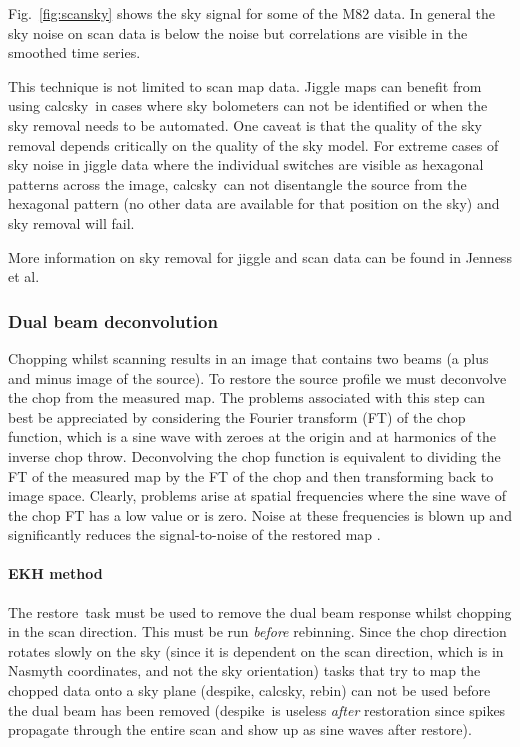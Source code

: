 \documentclass[twoside,11pt]{article}
\newcommand{\task}[1]{{\sf #1}}
\newcommand{\rebin}{\htmlref{\task{rebin}}{REBIN}}
\newcommand{\calcsky}{\htmlref{\task{calcsky}}{CALCSKY}}
\newcommand{\restore}{\htmlref{\task{restore}}{RESTORE}}
\newcommand{\despike}{\htmlref{\task{despike}}{DESPIKE}}
\newcommand{\htmlref}[2]{#1}
\renewcommand{\_}{\texttt{\symbol{95}}}
\begin{document}
Fig.\ \ref{fig:scansky} shows the sky signal for some of the M82 data.
In general the sky noise on scan data is below the noise but correlations
are visible in the smoothed time series.


This technique is not limited to scan map data. Jiggle maps can benefit
from using \calcsky\ in cases where sky bolometers can not be identified
or when the sky removal needs to be automated. One caveat is that the
quality of the sky removal depends critically on the quality of the
sky model. For extreme cases of sky noise in jiggle data where 
the individual switches are visible as hexagonal patterns across the
image, \calcsky\ can not disentangle the source from the hexagonal
pattern (no other data are available for that position on the sky) and
sky removal will fail.

More information on sky removal for jiggle and scan data can be found
in Jenness et al.\cite{spietj}

\subsubsection{Dual beam deconvolution}

Chopping whilst scanning results in an image that contains two beams (a plus
and minus image of the source). To restore the source profile we must
deconvolve the chop from the measured map. The problems associated with this
step can best be appreciated by considering the Fourier transform (FT) of the
chop function, which is a sine wave with zeroes at the origin and at harmonics
of the inverse chop throw.  Deconvolving the chop function is equivalent to
dividing the FT of the measured map by the FT of the chop and then
transforming back to image space. Clearly, problems arise at spatial
frequencies where the sine wave of the chop FT has a low value or is
zero. Noise at these frequencies is blown up and significantly reduces the
signal-to-noise of the restored map \cite{ekh}.  

\paragraph{EKH method}

The \restore\ task must be used to remove the dual beam response whilst
chopping in the scan direction. This must be run \emph{before} rebinning.
Since the chop direction rotates slowly on the sky (since it is dependent on
the scan direction, which is in Nasmyth coordinates, and not the sky
orientation) tasks that try to map the chopped data onto a sky plane
(\despike, \calcsky, \rebin) can not be used before the dual beam has been
removed (\despike\ is useless \emph{after} restoration since spikes propagate
through the entire scan and show up as sine waves after \restore).
\end{document}
